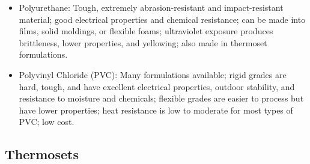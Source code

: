 \documentclass[
10pt,
a4paper,
openany,
svgnames,
]{book}
\begin{document}
\begin{itemize}[label=\scriptsize$\square$]
\item Polyurethane: Tough, extremely abrasion-resistant and impact-resistant material; good electrical properties and chemical resistance; can be made into films, solid moldings, or flexible foams; ultraviolet exposure produces brittleness, lower properties, and yellowing; also made in thermoset formulations.

\item Polyvinyl Chloride (PVC): Many formulations available; rigid grades are hard, tough, and have excellent electrical properties, outdoor stability, and resistance to moisture and chemicals; flexible grades are easier to process but have lower properties; heat resistance is low to moderate for most types of PVC; low cost.

\end{itemize}

\subsection{Thermosets}
\end{document}

